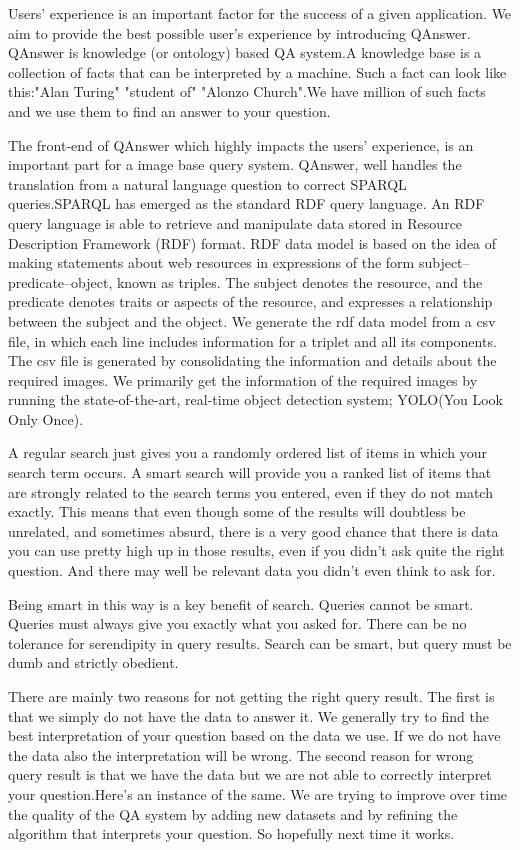 \documentclass[12pt]{article}
\begin{document}
Users’ experience is an important factor for the success of a given application\cite{diefenbach2017trill}. We aim to provide the best possible user's experience by introducing QAnswer. QAnswer is knowledge (or ontology) based QA system.A knowledge base is a collection of facts that can be interpreted by a machine. Such a fact can look like this:"Alan Turing" "student of" "Alonzo Church".We have million of such facts and we use them to find an answer to your question.

The front-end of QAnswer which highly impacts the users’ experience, is an important part for a image base query system\cite{dennis}. QAnswer, well handles the translation from a natural language question to correct SPARQL queries.SPARQL has emerged as the standard RDF query language. An RDF query language is able to retrieve and manipulate data stored in Resource Description Framework (RDF) format. RDF data model is based on the idea of making statements about web resources in expressions of the form subject–predicate–object, known as triples. The subject denotes the resource, and the predicate denotes traits or aspects of the resource, and expresses a relationship between the subject and the object\cite{wiki}. We generate the rdf data model from a csv file, in which each line includes information for a triplet and all its components. The csv file is generated by consolidating the information and details about the required images. We primarily get the information of the required images by running the state-of-the-art, real-time object detection system; YOLO(You Look Only Once).

A regular search just gives you a randomly ordered list of items in which your search term occurs. A smart search will provide you a ranked list of items that are strongly related to the search terms you entered, even if they do not match exactly. This means that even though some of the results will doubtless be unrelated, and sometimes absurd, there is a very good chance that there is data you can use pretty high up in those results, even if you didn't ask quite the right question. And there may well be relevant data you didn't even think to ask for.

Being smart in this way is a key benefit of search. Queries cannot be smart. Queries must always give you exactly what you asked for. There can be no tolerance for serendipity in query results. Search can be smart, but query must be dumb and strictly obedient\cite{QvsS}.

There are mainly two reasons for not getting the right query result.
The first is that we simply do not have the data to answer it. We generally try to find the best interpretation of your question based on the data we use. If we do not have the data also the interpretation will be wrong. 
The second reason for wrong query result is that we have the data but we are not able to correctly interpret your question.Here's an instance of the same.
We are trying to improve over time the quality of the QA system by adding new datasets and by refining the algorithm that interprets your question. So hopefully next time it works.
\end{document}
